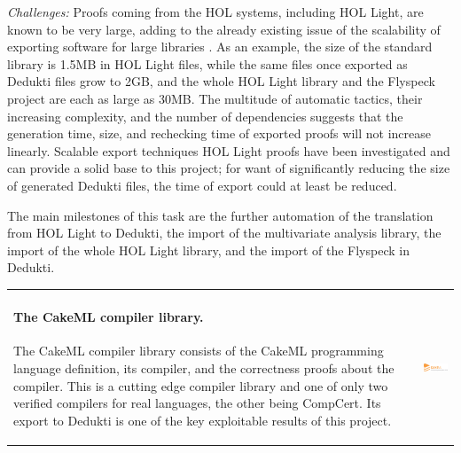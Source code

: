 \emph{Challenges:}
Proofs coming from the HOL systems, including {HOL Light}, are known to
be very large, adding to the already existing issue of the scalability of
exporting software for large libraries
\cite{DBLP:conf/tphol/Wong95,DBLP:conf/cade/ObuaS06,DBLP:conf/itp/KellerW10,
DBLP:conf/cade/Kumar13}. As an example, the size of the standard library is
1.5MB in {HOL Light} files, while the same files once
exported as {Dedukti} files grow to 2GB, and the whole
{HOL Light} library and the {Flyspeck} project are each as
large as 30MB. The multitude of automatic tactics, their increasing
complexity, and the number of dependencies suggests that the generation time, size,
and rechecking time of exported proofs will not increase linearly. Scalable
export techniques {HOL Light} proofs have been investigated
\cite{KaliszykK13} and can provide a solid base to
this project; for want of significantly reducing the size of generated
{Dedukti} files, the time of export could at least be reduced.

The main milestones of this task are the further automation of the
translation from {HOL Light} to {Dedukti}, the import of the
multivariate analysis library, the import of the whole {HOL Light}
library, and the import of the {Flyspeck} in {Dedukti}.

\bigskip
\hspace{-1cm}
\begin{tabular}{ll}
\begin{minipage}{13cm}
\paragraph*{The CakeML compiler library.}
The CakeML compiler library consists of the CakeML programming language
definition, its compiler, and the correctness proofs about the
compiler. This is a cutting edge compiler library and one of only two
verified compilers for real languages, the other being CompCert. Its
export to Dedukti is one of the key exploitable results of this project.
 \end{minipage}
&\begin{minipage}{4cm}
  \includegraphics[width=4cm]{logos/CakeML}
\end{minipage}
\end{tabular}

